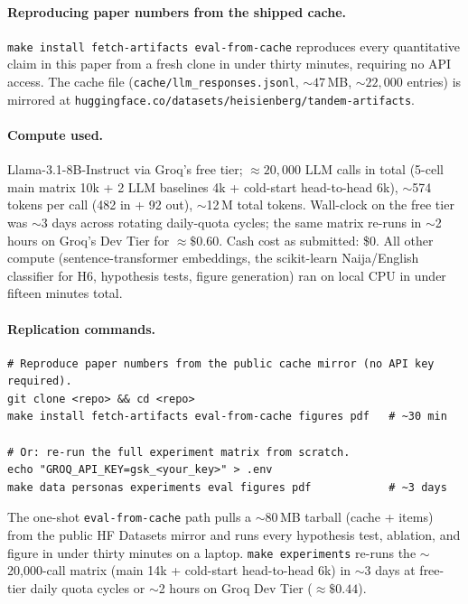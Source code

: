 \documentclass[8pt,twocolumn,a4paper]{extarticle}
\begin{document}
\paragraph{Reproducing paper numbers from the shipped cache.}
\texttt{make install fetch-artifacts eval-from-cache} reproduces every quantitative claim in this paper from a fresh clone in under thirty minutes, requiring no API access. The cache file (\texttt{cache/llm\_responses.jsonl}, ${\sim}47$\,MB, ${\sim}22{,}000$ entries) is mirrored at \texttt{huggingface.co/datasets/heisienberg/tandem-artifacts}.

\paragraph{Compute used.}
Llama-3.1-8B-Instruct via Groq's free tier; ${\approx}20{,}000$ LLM calls in total (5-cell main matrix 10k + 2 LLM baselines 4k + cold-start head-to-head 6k), $\sim$574 tokens per call (482 in + 92 out), $\sim$12\,M total tokens. Wall-clock on the free tier was $\sim$3 days across rotating daily-quota cycles; the same matrix re-runs in $\sim$2 hours on Groq's Dev Tier for ${\approx}\$0.60$. Cash cost as submitted: \$0. All other compute (sentence-transformer embeddings, the scikit-learn Naija/English classifier for H6, hypothesis tests, figure generation) ran on local CPU in under fifteen minutes total.

\paragraph{Replication commands.}
{\footnotesize
\begin{verbatim}
# Reproduce paper numbers from the public cache mirror (no API key required).
git clone <repo> && cd <repo>
make install fetch-artifacts eval-from-cache figures pdf   # ~30 min

# Or: re-run the full experiment matrix from scratch.
echo "GROQ_API_KEY=gsk_<your_key>" > .env
make data personas experiments eval figures pdf            # ~3 days
\end{verbatim}
}
\noindent The one-shot \texttt{eval-from-cache} path pulls a $\sim$80\,MB tarball (cache + items) from the public HF Datasets mirror and runs every hypothesis test, ablation, and figure in under thirty minutes on a laptop. \texttt{make experiments} re-runs the $\sim$20{,}000-call matrix (main 14k + cold-start head-to-head 6k) in $\sim$3 days at free-tier daily quota cycles or $\sim$2 hours on Groq Dev Tier ($\approx\$0.44$).
\end{document}
